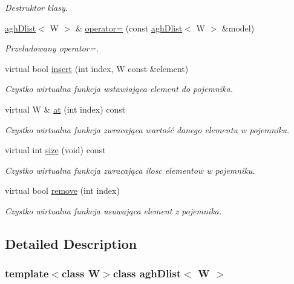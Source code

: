 \begin{DoxyCompactItemize}
\begin{DoxyCompactList}\small\item\em \-Destruktor klasy. \end{DoxyCompactList}\item 
\hyperlink{classaghDlist}{agh\-Dlist}$<$ \-W $>$ \& \hyperlink{classaghDlist_a330e04c4f6e559c6d8d7a6f44e92d4b9}{operator=} (const \hyperlink{classaghDlist}{agh\-Dlist}$<$ \-W $>$ \&model)
\begin{DoxyCompactList}\small\item\em \-Przeładowany operator=. \end{DoxyCompactList}\item 
virtual bool \hyperlink{classaghDlist_ad2407a41992a73acc3d40776fbed6334}{insert} (int index, \-W const \&element)
\begin{DoxyCompactList}\small\item\em \-Czystko wirtualna funkcja wstawiająca element do pojemnika. \end{DoxyCompactList}\item 
virtual \-W \& \hyperlink{classaghDlist_a52ec0e1ecb1ec296bc5efcef4d8c59b9}{at} (int index) const 
\begin{DoxyCompactList}\small\item\em \-Czystko wirtualna funkcja zwracająca wartość danego elementu w pojemniku. \end{DoxyCompactList}\item 
virtual int \hyperlink{classaghDlist_a58c2c6201d3bc48933b3592838910b3a}{size} (void) const 
\begin{DoxyCompactList}\small\item\em \-Czystko wirtualna funkcja zwracająca ilosc elementow w pojemniku. \end{DoxyCompactList}\item 
virtual bool \hyperlink{classaghDlist_a80f4b80ef002f29d4a98359cf9eff497}{remove} (int index)
\begin{DoxyCompactList}\small\item\em \-Czystko wirtualna funkcja usuwająca element z pojemnika. \end{DoxyCompactList}\end{DoxyCompactItemize}


\subsection{\-Detailed \-Description}
\subsubsection*{template$<$class \-W$>$class agh\-Dlist$<$ W $>$}

